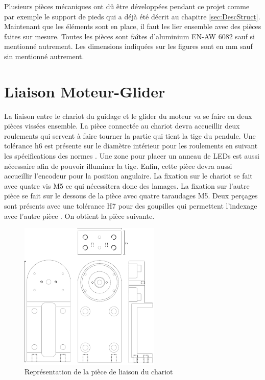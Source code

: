 Plusieurs pièces mécaniques ont dû être développées pendant ce projet comme par exemple le support de pieds  qui a déjà été décrit au chapitre \ref{sec:DescStruct}.
Maintenant que les éléments sont en place, il faut les lier ensemble avec des pièces faites sur mesure. Toutes les pièces sont faîtes
d'aluminium EN-AW 6082 sauf si mentionné autrement. Les dimensions indiquées sur les figures sont en mm sauf sin mentionné autrement.

\section{Liaison Moteur-Glider}\label{sec:LiaisonMotGlid}
La liaison entre le chariot du guidage et le \gls{glider} du moteur va se faire en deux pièces vissées ensemble. La pièce
connectée au chariot devra accueillir deux roulements qui servent à faire tourner la partie qui tient la tige du pendule. Une tolérance h6 est
présente sur le diamètre intérieur pour les roulements en suivant les spécifications des normes \cite{Ajustements}. Une zone pour placer un anneau de LEDs est aussi nécessaire afin de pouvoir illuminer
la tige. Enfin, cette pièce devra aussi accueillir l'encodeur pour la position angulaire. La fixation sur le chariot se fait avec quatre vis M5
ce qui nécessitera donc des lamages. La fixation sur l'autre pièce se fait sur le dessous de la pièce avec quatre taraudages M5. Deux perçages
sont présents avec une tolérance H7 pour des goupilles qui permettent l'indexage avec l'autre pièce . On obtient la pièce suivante.

\begin{figure}[H]
  \centering
  \includegraphics[width = 0.6\textwidth]{assets/figures/LiaisonChariot.svg}
  \caption{Représentation de la pièce de liaison du chariot}
  \label{fig:LiaisonChariot}
\end{figure}


